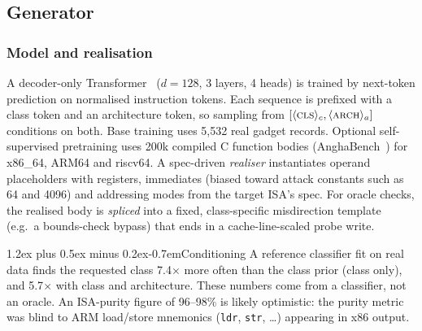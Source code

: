 \documentclass[conference]{IEEEtran}
\makeatletter
\renewcommand\paragraph{\@startsection{paragraph}{4}{\z@}%
  {1.2ex plus 0.5ex minus 0.2ex}{-0.7em}{\normalfont\normalsize\bfseries}}
\makeatother
\begin{document}

\subsection{Generator}
\label{sec:gen}

\subsubsection{Model and realisation}
A decoder-only Transformer~\cite{vaswani2017} ($d=128$, 3 layers, 4 heads) is
trained by next-token prediction on normalised instruction tokens. Each
sequence is prefixed with a class token and an architecture token, so sampling
from $[\langle\textsc{cls}\rangle_c, \langle\textsc{arch}\rangle_a]$ conditions on
both. Base training uses 5,532 real gadget records. Optional self-supervised
pretraining uses 200k compiled C function bodies (AnghaBench~\cite{anghabench})
for x86\_64, ARM64 and riscv64. A spec-driven \emph{realiser} instantiates
operand placeholders with registers, immediates (biased toward attack
constants such as 64 and 4096) and addressing modes from the target ISA's spec.
For oracle checks, the realised body is \emph{spliced} into a fixed,
class-specific misdirection template (e.g.\ a bounds-check bypass) that ends in
a cache-line-scaled probe write.

\paragraph{Conditioning}
A reference classifier fit on real data finds the requested class 7.4$\times$
more often than the class prior (class only), and 5.7$\times$ with class and
architecture. These numbers come from a classifier, not an oracle. An
ISA-purity figure of 96--98\% is likely optimistic: the purity metric was blind
to ARM load/store mnemonics (\texttt{ldr}, \texttt{str}, \ldots) appearing in
x86 output.
\end{document}
